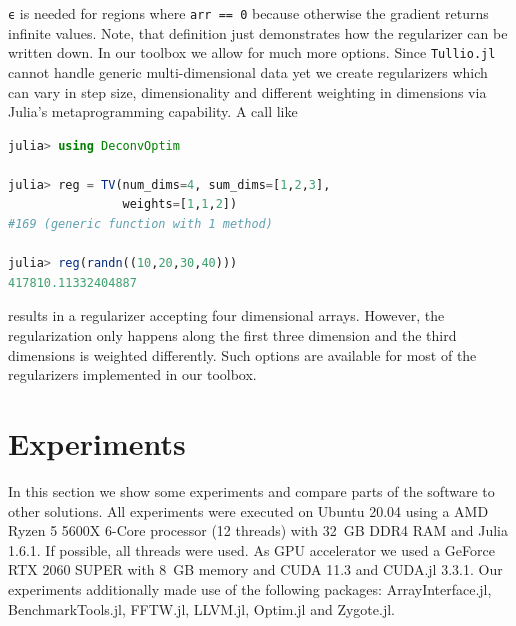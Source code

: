 \documentclass{juliacon}
\begin{document}
        \lstinline{ϵ} is needed for regions where \lstinline{arr == 0} because otherwise the gradient returns infinite values.
        Note, that definition just demonstrates how the regularizer can be written down.
        In our toolbox we allow for much more options. Since \verb|Tullio.jl| cannot handle generic multi-dimensional data yet
        we create regularizers which can vary in step size, dimensionality and
        different weighting in dimensions via Julia's metaprogramming capability.
        A call like 
        \begin{lstlisting}[language = Julia]
julia> using DeconvOptim

julia> reg = TV(num_dims=4, sum_dims=[1,2,3],
                weights=[1,1,2])
#169 (generic function with 1 method)

julia> reg(randn((10,20,30,40)))
417810.11332404887
        \end{lstlisting}
        results in a regularizer accepting four dimensional arrays. However, the regularization only happens along the first three dimension
        and the third dimensions is weighted differently.
        Such options are available for most of the regularizers implemented in our toolbox.

\section{Experiments}
    In this section we show some experiments and compare parts of the software to other solutions.
    All experiments were executed on Ubuntu 20.04 using a AMD Ryzen 5 5600X 6-Core processor (12 threads) with \SI{32}{GB} DDR4 RAM and Julia 1.6.1.
    If possible, all threads were used.
    As GPU accelerator we used a GeForce RTX 2060 SUPER with \SI{8}{GB} memory and CUDA 11.3 and CUDA.jl 3.3.1.
    Our experiments additionally made use of the following packages: ArrayInterface.jl\cite{DifferentialEquations.jl-2017}, 
    BenchmarkTools.jl\cite{BenchmarkTools.jl-2016}, FFTW.jl\cite{FFTW05}, LLVM.jl\cite{LLVM.jl-2017}, Optim.jl\cite{mogensen2018optim}
    and  Zygote.jl\cite{Zygote.jl-2018}. 
\end{document}
